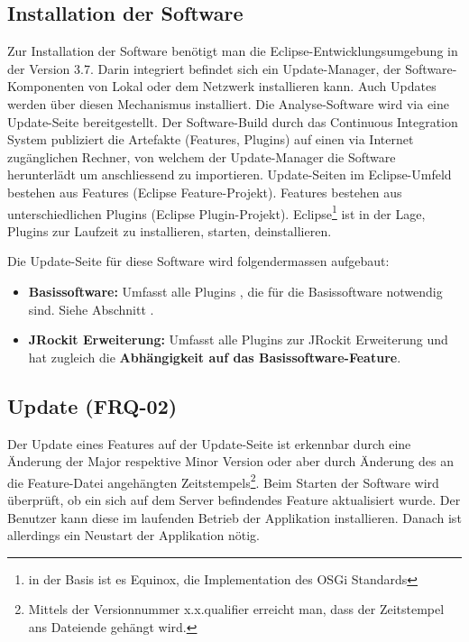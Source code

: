 \subsection{Installation der Software}\label{installation}
Zur Installation der Software benötigt man die Eclipse-Entwicklungsumgebung in der Version 3.7. Darin integriert befindet sich ein Update-Manager, der Software-Komponenten von Lokal oder dem Netzwerk installieren kann. Auch Updates werden über diesen Mechanismus installiert. Die Analyse-Software wird via eine Update-Seite bereitgestellt. Der Software-Build durch das Continuous Integration System publiziert die Artefakte (Features, Plugins) auf einen via Internet zugänglichen Rechner, von welchem der Update-Manager die Software herunterlädt um anschliessend zu importieren. Update-Seiten im Eclipse-Umfeld bestehen aus Features (Eclipse Feature-Projekt). Features bestehen aus unterschiedlichen Plugins (Eclipse Plugin-Projekt). Eclipse\footnote{in der Basis ist es Equinox, die Implementation des OSGi Standards} ist in der Lage, Plugins zur Laufzeit zu installieren, starten, deinstallieren.

Die Update-Seite für diese Software wird folgendermassen aufgebaut:
\begin{itemize}
\item \textbf{Basissoftware:} Umfasst alle Plugins , die für die Basissoftware notwendig sind. Siehe Abschnitt .
\item \textbf{JRockit Erweiterung: }Umfasst alle Plugins zur JRockit Erweiterung und hat zugleich die \textbf{Abhängigkeit auf das Basissoftware-Feature}.
\end{itemize}

\subsection{Update (FRQ-02)}
Der Update eines Features auf der Update-Seite ist erkennbar durch eine Änderung der Major respektive Minor Version oder aber durch Änderung des an die Feature-Datei angehängten Zeitstempels\footnote{Mittels der Versionnummer x.x.qualifier erreicht man, dass der Zeitstempel ans Dateiende gehängt wird.}. Beim Starten der Software wird überprüft, ob ein sich auf dem Server befindendes Feature aktualisiert wurde. Der Benutzer kann diese im laufenden Betrieb der Applikation installieren. Danach ist allerdings ein Neustart der Applikation nötig. 


